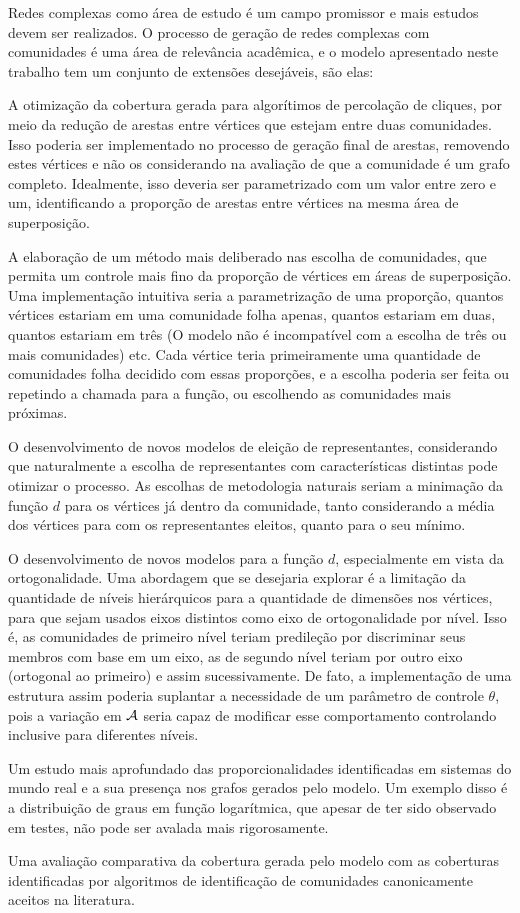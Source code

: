 \documentclass[notes.tex]{subfiles}
\begin{document}
Redes complexas como área de estudo é um campo promissor e mais estudos devem ser realizados.
O processo de geração de redes complexas com comunidades é uma área de relevância acadêmica, e o modelo apresentado neste trabalho tem um conjunto de extensões desejáveis, são elas:

A otimização da cobertura gerada para algorítimos de percolação de cliques, por meio da redução de arestas entre vértices que estejam entre duas comunidades.
Isso poderia ser implementado no processo de geração final de arestas, removendo estes vértices e não os considerando na avaliação de que a comunidade é um grafo completo.
Idealmente, isso deveria ser parametrizado com um valor entre zero e um, identificando a proporção de arestas entre vértices na mesma área de superposição.

A elaboração de um método mais deliberado nas escolha de comunidades, que permita um controle mais fino da proporção de vértices em áreas de superposição.
Uma implementação intuitiva seria a parametrização de uma proporção, quantos vértices estariam em uma comunidade folha apenas, quantos estariam em duas, quantos estariam em três (O modelo não é incompatível com a escolha de três ou mais comunidades) etc.
Cada vértice teria primeiramente uma quantidade de comunidades folha decidido com essas proporções, e a escolha poderia ser feita ou repetindo a chamada para a função, ou escolhendo as comunidades mais próximas.

O desenvolvimento de novos modelos de eleição de representantes, considerando que naturalmente a escolha de representantes com características distintas pode otimizar o processo.
As escolhas de metodologia naturais seriam a minimação da função $d$ para os vértices já dentro da comunidade, tanto considerando a média dos vértices para com os representantes eleitos, quanto para o seu mínimo.

O desenvolvimento de novos modelos para a função $d$, especialmente em vista da ortogonalidade.
Uma abordagem que se desejaria explorar é a limitação da quantidade de níveis hierárquicos para a quantidade de dimensões nos vértices, para que sejam usados eixos distintos como eixo de ortogonalidade por nível.
Isso é, as comunidades de primeiro nível teriam predileção por discriminar seus membros com base em um eixo, as de segundo nível teriam por outro eixo (ortogonal ao primeiro) e assim sucessivamente.
De fato, a implementação de uma estrutura assim poderia suplantar a necessidade de um parâmetro de controle  $\theta$, pois a variação em  $\operatorname{\mathcal{A}}$ seria capaz de modificar esse comportamento controlando inclusive para diferentes níveis.

Um estudo mais aprofundado das proporcionalidades identificadas em sistemas do mundo real e a sua presença nos grafos gerados pelo modelo.
Um exemplo disso é a distribuição de graus em função logarítmica, que apesar de ter sido observado em testes, não pode ser avalada mais rigorosamente.

Uma avaliação comparativa da cobertura gerada pelo modelo com as coberturas identificadas por algoritmos de identificação de comunidades canonicamente aceitos na literatura.
\end{document}
